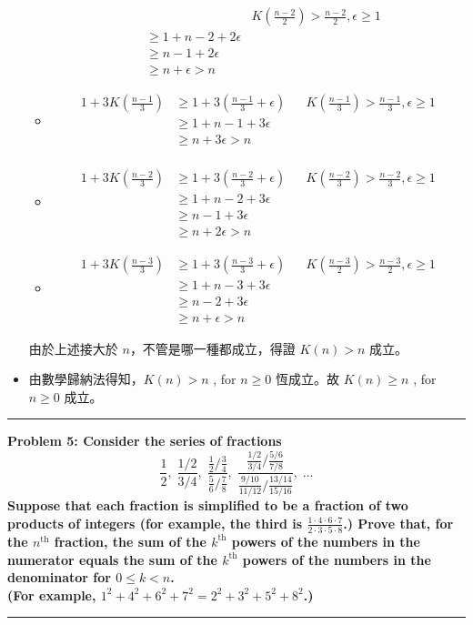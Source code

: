 \documentclass[11pt]{article}
\newcommand\question[2]{\vspace{.25in}\hrule\textbf{#1: #2}\vspace{.5em}\hrule\vspace{.10in}}
\begin{document}
\begin{itemize}
\begin{itemize}
\begin{align*}
					&& K(\frac{n-2}{2}) > \frac{n-2}{2}, \epsilon \ge 1\\
					& \ge 1 + n - 2 + 2 \epsilon \\
					& \ge n - 1 + 2 \epsilon \\
					& \ge n + \epsilon > n
			\end{align*}
		\item
			\begin{align*}
				1 + 3K(\frac{n-1}{3}) & \ge 1 + 3 \left ( \frac{n-1}{3} + \epsilon \right )
					&& K(\frac{n-1}{3}) > \frac{n-1}{3}, \epsilon \ge 1\\
					& \ge 1 + n - 1 + 3 \epsilon \\
					& \ge n + 3 \epsilon > n\\
			\end{align*}
		\item
			\begin{align*}
				1 + 3K(\frac{n-2}{3}) & \ge 1 + 3 \left ( \frac{n-2}{3} + \epsilon \right )
					&& K(\frac{n-2}{3}) > \frac{n-2}{3}, \epsilon \ge 1\\
					& \ge 1 + n - 2 + 3 \epsilon \\
					& \ge n - 1 + 3 \epsilon \\
					& \ge n + 2 \epsilon > n
			\end{align*}
		\item
			\begin{align*}
				1 + 3K(\frac{n-3}{3}) & \ge 1 + 3 \left ( \frac{n-3}{3} + \epsilon \right )
					&& K(\frac{n-3}{2}) > \frac{n-3}{2}, \epsilon \ge 1\\
					& \ge 1 + n - 3 + 3 \epsilon \\
					& \ge n - 2 + 3 \epsilon \\
					& \ge n + \epsilon > n
			\end{align*}
	\end{itemize}
	由於上述接大於 $n$，不管是哪一種都成立，得證 $K(n) > n$ 成立。
	\item 由數學歸納法得知，$K(n) > n$ , for $n \ge 0$ 恆成立。故 $K(n) \ge n$ , for $n \ge 0$ 成立。
\end{itemize}

\question{Problem 5}{Consider the series of fractions
	$$
		\frac{1}{2}, \; 
		\frac{1/2}{3/4}, \; 
		\frac{\frac{1}{2}/\frac{3}{4}}{\frac{5}{6}/\frac{7}{8}}, \; 
		\frac{\frac{1/2}{3/4}/\frac{5/6}{7/8}}{\frac{9/10}{11/12}/\frac{13/14}{15/16}}, \;
		\hdots
	$$
	Suppose that each fraction is simplified to be a fraction of two products of integers 
	(for example, the third is $\frac{1 \cdot 4 \cdot 6 \cdot 7}{2 \cdot 3 \cdot 5 \cdot 8}$.)
	Prove that, for the $n^{\text{th}}$ fraction, the sum of the $k^{\text{th}}$ powers of the 
	numbers in the numerator equals the sum of the $k^{\text{th}}$ powers of the numbers
	in the denominator for $0 \le k < n$. \\
	(For example, $1^2 + 4^2 + 6^2 + 7^2 = 2^2 + 3^2 + 5^2 + 8^2$.)
}
\end{document}
